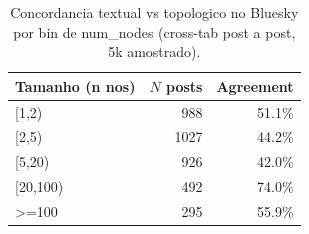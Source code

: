 \begin{table}[H]\centering
\caption{Concordancia textual vs topologico no Bluesky por bin de num\_nodes (cross-tab post a post, 5k amostrado).}
\label{tab:bluesky_concord_size}
\begin{tabular}{lrr}
\toprule
Tamanho (n nos) & $N$ posts & Agreement \\
\midrule
{}[1,2) & 988 & 51.1\% \\
{}[2,5) & 1027 & 44.2\% \\
{}[5,20) & 926 & 42.0\% \\
{}[20,100) & 492 & 74.0\% \\
>=100 & 295 & 55.9\% \\
\bottomrule
\end{tabular}
\end{table}